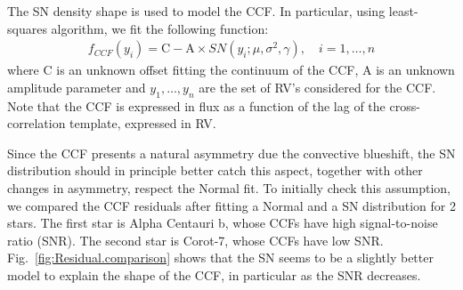 \documentclass[11pt, oneside]{article}
\begin{document}
The SN density shape is used to model the CCF.  In particular, using least-squares algorithm, we fit the following function:
%
\begin{eqnarray} \label{eq:3}
f_{CCF}(y_i) = \mathrm{C} - \mathrm{A} \times SN(y_i;\mu, \sigma^2, \gamma), \quad i = 1, \ldots, n
\end{eqnarray}
%
where C is an unknown offset fitting the continuum of the CCF, A is an unknown amplitude parameter and $y_1, \ldots, y_n$ are the set of RV's considered for the CCF. Note that the CCF is expressed in flux as a function of the lag of the cross-correlation template, expressed in RV.

Since the CCF presents a natural asymmetry due the convective blueshift, the SN distribution should in principle better catch this aspect, together with other changes in asymmetry, respect the Normal fit. To initially check this assumption, we compared the CCF residuals after fitting a Normal and a SN distribution for 2 stars. The first star is Alpha Centauri b, whose CCFs have high signal-to-noise ratio (SNR). The second star is Corot-7, whose CCFs have low SNR. Fig.~\ref{fig:Residual.comparison} shows that the SN seems to be a slightly better model to explain the shape of the CCF, in particular as the SNR decreases.
%
\end{document}
